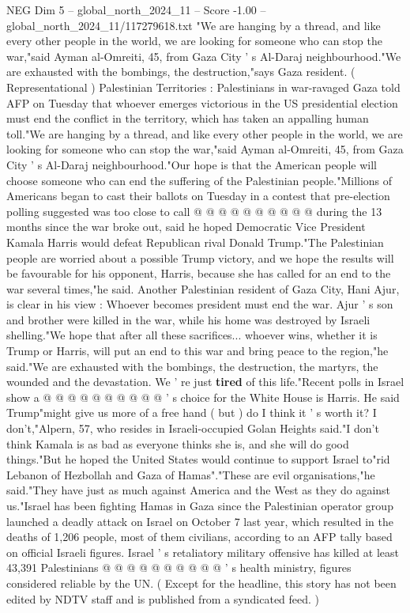 \begin{textsample}{NEG Dim 5 – global\_north\_2024\_11 – Score -1.00 – global\_north\_2024\_11/117279618.txt}  \label{ex:f5_neg_424}
"We are hanging by a thread, and like every other people in the world, we are looking for someone who can stop the war,"said Ayman al-Omreiti, 45, from Gaza City ' s Al-Daraj neighbourhood."We are exhausted with the bombings, the destruction,"says Gaza resident. ( Representational ) Palestinian Territories : Palestinians in war-ravaged Gaza told AFP on Tuesday that whoever emerges victorious in the US presidential election must end the conflict in the territory, which has taken an appalling human toll."We are hanging by a thread, and like every other people in the world, we are looking for someone who can stop the war,"said Ayman al-Omreiti, 45, from Gaza City ' s Al-Daraj neighbourhood."Our hope is that the American people will choose someone who can end the suffering of the Palestinian people."Millions of Americans began to cast their ballots on Tuesday in a contest that pre-election polling suggested was too close to call @ @ @ @ @ @ @ @ @ @ during the 13 months since the war broke out, said he hoped Democratic Vice President Kamala Harris would defeat Republican rival Donald Trump."The Palestinian people are worried about a possible Trump victory, and we hope the results will be favourable for his opponent, Harris, because she has called for an end to the war several times,"he said.
Another Palestinian resident of Gaza City, Hani Ajur, is clear in his view : Whoever becomes president must end the war.
Ajur ' s son and brother were killed in the war, while his home was destroyed by Israeli shelling."We hope that after all these sacrifices... whoever wins, whether it is Trump or Harris, will put an end to this war and bring peace to the region,"he said."We are exhausted with the bombings, the destruction, the martyrs, the wounded and the devastation.
We ' re just \textbf{tired} of this life."Recent polls in Israel show a @ @ @ @ @ @ @ @ @ @ ' s choice for the White House is Harris.
He said Trump"might give us more of a free hand ( but ) do I think it ' s worth it?
I don't,"Alpern, 57, who resides in Israeli-occupied Golan Heights said."I don't think Kamala is as bad as everyone thinks she is, and she will do good things."But he hoped the United States would continue to support Israel to"rid Lebanon of Hezbollah and Gaza of Hamas"."These are evil organisations,"he said."They have just as much against America and the West as they do against us."Israel has been fighting Hamas in Gaza since the Palestinian operator group launched a deadly attack on Israel on October 7 last year, which resulted in the deaths of 1,206 people, most of them civilians, according to an AFP tally based on official Israeli figures.
Israel ' s retaliatory military offensive has killed at least 43,391 Palestinians @ @ @ @ @ @ @ @ @ @ ' s health ministry, figures considered reliable by the UN. ( Except for the headline, this story has not been edited by NDTV staff and is published from a syndicated feed. )

\end{textsample}
